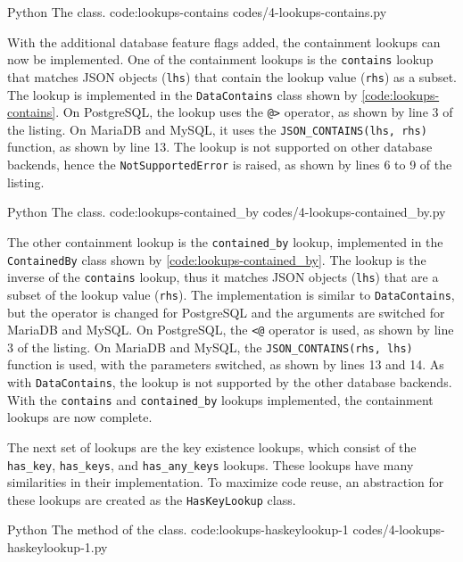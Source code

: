 \listing
{Python}
{The  class.}
{code:lookups-contains}
{codes/4-lookups-contains.py}

With the additional database feature flags added, the containment lookups can
now be implemented. One of the containment lookups is the \verb|contains|
lookup that matches JSON objects (\verb|lhs|) that contain the lookup value
(\verb|rhs|) as a subset. The lookup is implemented in the \verb|DataContains|
class shown by \autoref{code:lookups-contains}. On PostgreSQL, the lookup uses
the \verb|@>| operator, as shown by line 3 of the listing. On MariaDB and
MySQL, it uses the \verb|JSON_CONTAINS(lhs, rhs)| function, as shown by line
13. The lookup is not supported on other database backends, hence the
\verb|NotSupportedError| is raised, as shown by lines 6 to 9 of the listing.

\listing
{Python}
{The  class.}
{code:lookups-contained_by}
{codes/4-lookups-contained_by.py}

The other containment lookup is the \verb|contained_by| lookup, implemented in
the \verb|ContainedBy| class shown by \autoref{code:lookups-contained_by}. The
lookup is the inverse of the \verb|contains| lookup, thus it matches JSON
objects (\verb|lhs|) that are a subset of the lookup value (\verb|rhs|). The
implementation is similar to \verb|DataContains|, but the operator is changed
for PostgreSQL and the arguments are switched for MariaDB and MySQL. On
PostgreSQL, the \verb|<@| operator is used, as shown by line 3 of the listing.
On MariaDB and MySQL, the \verb|JSON_CONTAINS(rhs, lhs)| function is used, with
the parameters switched, as shown by lines 13 and 14. As with
\verb|DataContains|, the lookup is not supported by the other database
backends. With the \verb|contains| and \verb|contained_by| lookups implemented,
the containment lookups are now complete.

The next set of lookups are the key existence lookups, which consist of the
\verb|has_key|, \verb|has_keys|, and \verb|has_any_keys| lookups. These
lookups have many similarities in their implementation. To maximize code reuse,
an abstraction for these lookups are created as the \verb|HasKeyLookup| class.

\listing
{Python}
{The  method of the  class.}
{code:lookups-haskeylookup-1}
{codes/4-lookups-haskeylookup-1.py}

